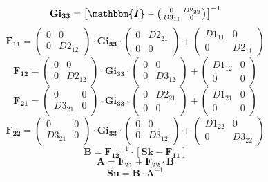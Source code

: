 \[ \mathbf{Gi_{33}} = \left[\boldsymbol{\mathbbm{I}}
-\left(\begin{smallmatrix} 0 & D2_{22} \\ D3_{11} & 0
\end{smallmatrix}\right)\right]^{-1} \]
\[ \mathbf{F_{11}} = \left(\begin{smallmatrix} 0 & 0 \\ 0 & D2_{12}
\end{smallmatrix}\right) \cdot\mathbf{Gi_{33}}\cdot
\left(\begin{smallmatrix} 0 & D2_{21} \\ 0 & 0
\end{smallmatrix}\right) + \left(\begin{smallmatrix} D1_{11} & 0 \\ 0
& D2_{11} \end{smallmatrix}\right) \]
\[ \mathbf{F_{12}} = \left(\begin{smallmatrix} 0 & 0 \\ 0 & D2_{12}
\end{smallmatrix}\right) \cdot\mathbf{Gi_{33}}\cdot
\left(\begin{smallmatrix} 0 & 0 \\ 0 & D3_{12}
\end{smallmatrix}\right) + \left(\begin{smallmatrix} D1_{12} & 0 \\ 0
& 0 \end{smallmatrix}\right) \]
\[ \mathbf{F_{21}} = \left(\begin{smallmatrix} 0 & 0 \\ D3_{21} & 0
\end{smallmatrix}\right) \cdot\mathbf{Gi_{33}}\cdot
\left(\begin{smallmatrix} 0 & D2_{21} \\ 0 & 0
\end{smallmatrix}\right) + \left(\begin{smallmatrix} D1_{21} & 0 \\ 0
& 0 \end{smallmatrix}\right) \]
\[ \mathbf{F_{22}} = \left(\begin{smallmatrix} 0 & 0 \\ D3_{21} & 0
\end{smallmatrix}\right) \cdot\mathbf{Gi_{33}}\cdot
\left(\begin{smallmatrix} 0 & 0 \\ 0 & D3_{12}
\end{smallmatrix}\right) + \left(\begin{smallmatrix} D1_{22} & 0 \\ 0
& D3_{22} \end{smallmatrix}\right) \]
\[ \mathbf{B}=\mathbf{F_{12}}^{-1}\cdot\left[ \mathbf{Sk} -
\mathbf{F_{11}} \right]  \]
\[ \mathbf{A}=\mathbf{F_{21}}+ \mathbf{F_{22}}\cdot\mathbf{B} \]
\[ \mathbf{Su} = \mathbf{B} \cdot \mathbf{A}^{-1} \]

